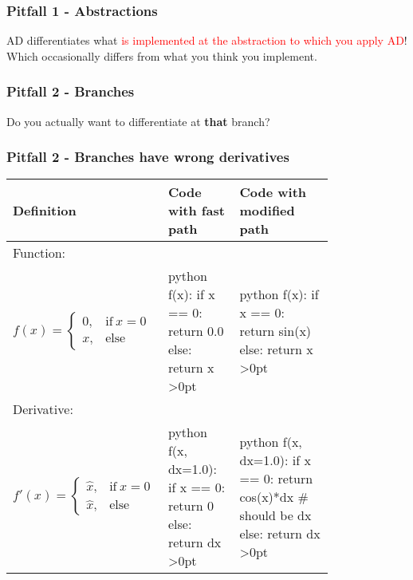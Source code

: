 \documentclass[11pt]{beamer}
\makeatletter
\newenvironment{tabminted}{%
  \let\FV@ListVSpace\relax  
  \minted
}{%
  \endminted
  \unskip   
  \aftergroup\@tabmintedend
}
\newcommand*{\tabminted@finalstrut}[1]{%
  \ifdim\prevdepth>0pt
    \ifdim\dp#1>\prevdepth
      \vskip\dimexpr(\dp#1)-\prevdepth\relax
    \fi
  \else
    \vskip\dimexpr(\dp#1)\relax
  \fi
}
\newcommand*{\@tabmintedend}{%
  \let\@finalstrut\tabminted@finalstrut
}
\makeatother
\begin{document}
\begin{frame}
	\frametitle{Pitfall 1 - Abstractions}

	AD differentiates what \textcolor{red}{is implemented at the abstraction to which you apply AD}! Which occasionally differs from what you think you implement.
\end{frame}


\begin{frame}
	\frametitle{Pitfall 2 - Branches}

	\begin{center}
		Do you actually want to differentiate at \textbf{that} branch?
	\end{center}
\end{frame}

\begin{frame}[fragile]
	\frametitle{Pitfall 2 - Branches have wrong derivatives}

	\small
	\begin{tabular}{l|p{0.3\linewidth}|p{0.5\linewidth}}
		Definition & Code with fast path & Code with modified path \\
		\toprule
		Function: \\
		$f(x) = \begin{cases}
		      0, & \text{if}\ x=0 \\
		      x, & \text{else}
	      \end{cases}$ & \begin{tabminted}{python}
f(x):
   if x == 0:
      return 0.0
   else:
      return x
		\end{tabminted}
		& 
		\begin{tabminted}{python}
f(x):
  if x == 0:
     return sin(x)
  else:
     return x
		\end{tabminted} 
		\\
		\hline
		Derivative: \\
		$f'(x) = \begin{cases}
			\hat{x}, &\text{if}\ x=0 \\
			\hat{x}, &\text{else}
		\end{cases}
		$ & \begin{tabminted}{python}
f(x, dx=1.0):
   if x == 0:
      return 0 
   else:
      return dx
      		\end{tabminted}
		  &
		  \begin{tabminted}{python}
f(x, dx=1.0):
  if x == 0:
    return cos(x)*dx # should be dx
  else:
    return dx
		\end{tabminted}
		\\
	\end{tabular}
\end{frame}
\end{document}
